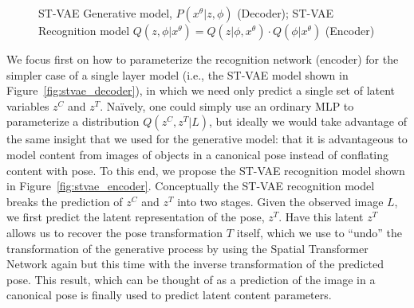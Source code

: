 \begin{figure}[t]
\begin{center}
\qquad\qquad
{}
\end{center}
 \caption{ ST-VAE Generative model, $P(x^\theta | z,\phi)$ (Decoder);  ST-VAE Recognition model $Q(z,\phi |x^\theta) = Q(z | \phi,x^\theta)\cdot Q(\phi|x^\theta)$ (Encoder)  }
 
\label{fig:stvaemodel}
\end{figure}


We focus first on how to parameterize the recognition network (encoder) for the simpler case of a single layer model (i.e., the ST-VAE model
shown in Figure~\ref{fig:stvae_decoder}), in which we need only predict a single set of latent variables $z^C$ and $z^T$.
Na\"{i}vely, one could 
simply use an ordinary MLP to parameterize a distribution $Q(z^C, z^T | L)$, but ideally we would take advantage of the same
 insight that we used for the generative model: that it is advantageous to model content from images of objects in a canonical pose instead
 of conflating content with pose.  To this end, we propose the ST-VAE recognition model shown in Figure~\ref{fig:stvae_encoder}. 
Conceptually the ST-VAE recognition model breaks the prediction of $z^C$ and $z^T$ into two stages.  Given the observed image $L$,
we first predict the latent representation of the pose, $z^T$.  Have this latent $z^T$ allows us to recover the pose transformation 
$T$ itself, which we use to ``undo'' the transformation of the generative process
by using the Spatial Transformer Network again but this time with the inverse transformation of the predicted pose.  This result, which can be
thought of as a prediction of the image in a canonical pose is finally used to predict latent content parameters.


